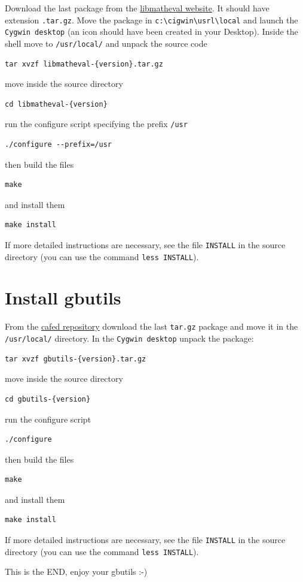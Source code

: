 \documentclass[11pt]{article}
\begin{document}
Download the last package from the \href{https://www.gnu.org/software/libmatheval/}{libmatheval website}. It should have
extension \texttt{.tar.gz}. Move the package in \texttt{c:\textbackslash{}cigwin\textbackslash{}usrl\textbackslash{}local} and
launch the \texttt{Cygwin desktop} (an icon should have been created in your
Desktop). Inside the shell move to \texttt{/usr/local/} and unpack the source
code

\begin{verbatim}
tar xvzf libmatheval-{version}.tar.gz
\end{verbatim}

move inside the source directory

\begin{verbatim}
cd libmatheval-{version}
\end{verbatim}

run the configure script specifying the prefix \texttt{/usr}

\begin{verbatim}
./configure --prefix=/usr
\end{verbatim}

then build the files

\begin{verbatim}
make
\end{verbatim}

and install them

\begin{verbatim}
make install
\end{verbatim}

If more detailed instructions are necessary, see the file \texttt{INSTALL} in
the source directory (you can use the command \verb~less INSTALL~).

\section{Install gbutils}
\label{sec-4}

From the \href{ftp://cafed.sssup.it/packages/}{cafed repository} download the last \texttt{tar.gz} package and move
it in the \texttt{/usr/local/} directory. In the \texttt{Cygwin desktop} unpack the
package:
\begin{verbatim}
tar xvzf gbutils-{version}.tar.gz
\end{verbatim}
move inside the source directory
\begin{verbatim}
cd gbutils-{version}
\end{verbatim}
run the configure script
\begin{verbatim}
./configure
\end{verbatim}
then build the files
\begin{verbatim}
make
\end{verbatim}
and install them
\begin{verbatim}
make install
\end{verbatim}

If more detailed instructions are necessary, see the file \texttt{INSTALL} in
the source directory (you can use the command \verb~less INSTALL~).

This is the END, enjoy your gbutils :-)
\end{document}
